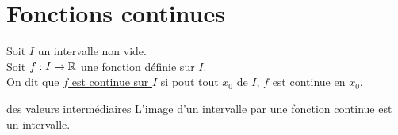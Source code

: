 \documentclass[12pt,twoside,a4paper]{article}
\author{MPSI 2}
\begin{document}
	\maketitle
	\section{Fonctions continues}
		\begin{flushleft}
			Soit $I$ un intervalle non vide.\\
			Soit $f: I\rightarrow \mathbb{R}$ une fonction définie sur $I$.\\
			On dit que \underline{$f$ est continue sur $I$} si pout tout $x_0$ de $I$, $f$ est continue en $x_0$.
		\end{flushleft}
		\begin{theo}{des valeurs intermédiaires}
			L'image d'un intervalle par une fonction continue est un intervalle.
		\end{theo}
\end{document}
